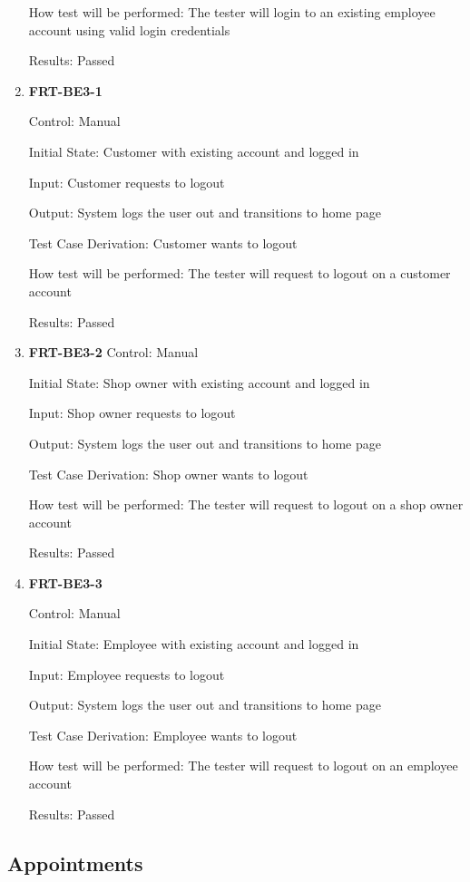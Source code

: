 \documentclass[12pt, titlepage]{article}
\begin{document}
\begin{enumerate}
	      How test will be performed: The tester will login to an existing employee account using valid login
	      credentials

	      Results: Passed

	\item \textbf{FRT-BE3-1}

	      Control: Manual

	      Initial State: Customer with existing account and logged in

	      Input: Customer requests to logout

	      Output: System logs the user out and transitions to home page

	      Test Case Derivation: Customer wants to logout

	      How test will be performed: The tester will request to logout on a customer account

	      Results: Passed

	\item \textbf{FRT-BE3-2}
	      Control: Manual

	      Initial State: Shop owner with existing account and logged in

	      Input: Shop owner requests to logout

	      Output: System logs the user out and transitions to home page

	      Test Case Derivation: Shop owner wants to logout

	      How test will be performed: The tester will request to logout on a shop owner account

	      Results: Passed

	\item \textbf{FRT-BE3-3}

	      Control: Manual

	      Initial State: Employee with existing account and logged in

	      Input: Employee requests to logout

	      Output: System logs the user out and transitions to home page

	      Test Case Derivation: Employee wants to logout

	      How test will be performed: The tester will request to logout on an employee account

	      Results: Passed

\end{enumerate}

\subsection{Appointments}
\end{document}
